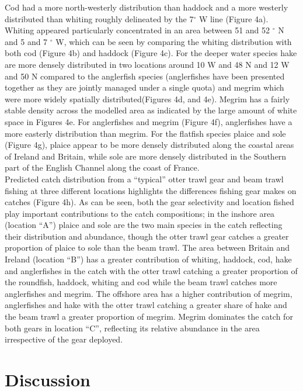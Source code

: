 \documentclass[fleqn,10pt]{wlscirep}
\begin{document}
\begin{linenumbers}
Cod had a more north-westerly distribution than haddock and a more westerly
distributed than whiting roughly delineated by the 7$^{\circ}$ W line (Figure
4a). Whiting appeared particularly concentrated in an area between 51 and 52
$^{\circ}$ N and 5 and 7 $^{\circ}$ W, which can be seen by comparing the
whiting distribution with both cod (Figure 4b) and haddock (Figure 4c). For the
deeper water species hake are more densely distributed in two locations around
10 W and 48 N and 12 W and 50 N compared to the anglerfish species
(anglerfishes have been presented together as they are jointly managed under a
single quota) and megrim which were more widely spatially distributed(Figures
4d, and 4e). Megrim has a fairly stable density across the modelled area as
indicated by the large amount of white space in Figures 4e. For anglerfishes
and megrim (Figure 4f), anglerfishes have a more easterly distribution than
megrim.  For the flatfish species plaice and sole (Figure 4g), plaice appear to
be more densely distributed along the coastal areas of Ireland and Britain,
while sole are more densely distributed in the Southern part of the English
Channel along the coast of France.\\

Predicted catch distribution from a ``typical'' otter trawl gear and beam trawl
fishing at three different locations highlights the differences fishing gear
makes on catches (Figure 4h). As can be seen, both the gear selectivity and
location fished play important contributions to the catch compositions; in the
inshore area (location ``A'') plaice and sole are the two main species in the
catch reflecting their distribution and abundance, though the otter trawl gear
catches a greater proportion of plaice to sole than the beam trawl.  The area
between Britain and Ireland (location ``B'') has a greater contribution of
whiting, haddock, cod, hake and anglerfishes in the catch with the otter trawl
catching a greater proportion of the roundfish, haddock, whiting and cod while
the beam trawl catches more anglerfishes and megrim. The offshore area has a
higher contribution of megrim, anglerfishes and hake with the otter trawl
catching a greater share of hake and the beam trawl a greater proportion of
megrim. Megrim dominates the catch for both gears in location ``C'', reflecting
its relative abundance in the area irrespective of the gear deployed.  \\

\section*{Discussion\\}


\end{linenumbers}
\end{document}
